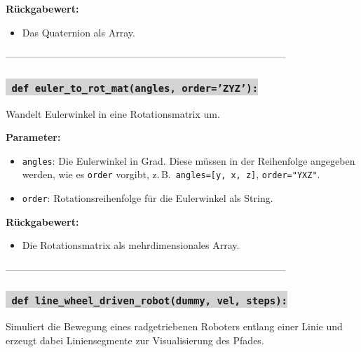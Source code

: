 \noindent \textbf{Rückgabewert:} \vspace{-6ex} \\
\begin{itemize}
    \setlength{\itemindent}{1em}
    \item Das Quaternion als Array.
\end{itemize}

--------------------------------------------------------------------------------------


\subsubsection*{\colorbox{lightgray}{\texttt{\textbf{\color{green} def} \color{blue} euler\_to\_rot\_mat}\textbf{\texttt{(angles, order='ZYZ'):}}}}
Wandelt Eulerwinkel in eine Rotationsmatrix um.

\noindent \textbf{Parameter:} \vspace{-6ex} \\
\begin{itemize}
    \setlength{\itemindent}{1em}
    \item \texttt{angles}: Die Eulerwinkel in Grad. Diese müssen in der Reihenfolge angegeben werden, wie es \texttt{order} vorgibt, z.\,B.\ \texttt{angles=[y, x, z]}, \texttt{order="YXZ"}.
    \item \texttt{order}: Rotationsreihenfolge für die Eulerwinkel als String.
\end{itemize}

\noindent \textbf{Rückgabewert:} \vspace{-6ex} \\
\begin{itemize}
    \setlength{\itemindent}{1em}
    \item Die Rotationsmatrix als mehrdimensionales Array.
\end{itemize}

--------------------------------------------------------------------------------------

\label{sec:line_wheel_driven_robot}
\subsubsection*{\colorbox{lightgray}{\texttt{\textbf{\color{green} def} \color{blue} line\_wheel\_driven\_robot}\textbf{\texttt{(dummy, vel, steps):}}}}
Simuliert die Bewegung eines radgetriebenen Roboters entlang einer Linie und erzeugt dabei Liniensegmente zur Visualisierung des Pfades.

